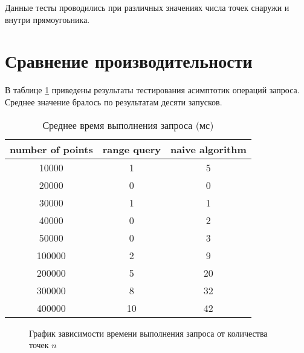 \documentclass[12pt,a4paper]{article}
\begin{document}
Данные тесты проводились при различных значениях числа точек снаружи и внутри прямоугоьника.

\section*{Сравнение производительности}

В таблице \ref{table:durations} приведены результаты тестирования асимптотик операций запроса. Среднее значение бралось по результатам десяти запусков.

\begin{table}[h]
	\begin{tabular}{c | c | c}
		number of points & range query & naive algorithm \\
		\hline
		10000 & 1 & 5 \\
		20000 & 0 & 0 \\
		30000 & 1 & 1 \\
		40000 & 0 & 2 \\
		50000 & 0 & 3 \\
		100000 & 2 & 9 \\
		200000 & 5 & 20 \\
		300000 & 8 & 32 \\
		400000 & 10 & 42 \\
	\end{tabular}

	\caption{Среднее время выполнения запроса (мс)}
	\label{table:durations}
\end{table}

\begin{figure}[h]

	\caption{График зависимости времени выполнения запроса от количества точек $n$}
	\label{pic:durations}
\end{figure}
\end{document}
